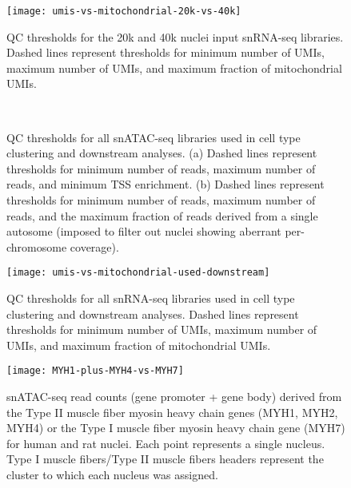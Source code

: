 \documentclass{article}
\begin{document}
\begin{figure}
\texttt{[image: umis-vs-mitochondrial-20k-vs-40k]}
\caption{QC thresholds for the 20k and 40k nuclei input snRNA-seq libraries. Dashed lines represent thresholds for minimum number of UMIs, maximum number of UMIs, and maximum fraction of mitochondrial UMIs.}
\end{figure} 

\begin{figure}
	\\
	\caption{QC thresholds for all snATAC-seq libraries used in cell type clustering and downstream analyses. (a) Dashed lines represent thresholds for minimum number of reads, maximum number of reads, and minimum TSS enrichment. (b) Dashed lines represent thresholds for minimum number of reads, maximum number of reads, and the maximum fraction of reads derived from a single autosome (imposed to filter out nuclei showing aberrant per-chromosome coverage).}
\end{figure} 

\begin{figure}
\texttt{[image: umis-vs-mitochondrial-used-downstream]}
\caption{QC thresholds for all snRNA-seq libraries used in cell type clustering and downstream analyses. Dashed lines represent thresholds for minimum number of UMIs, maximum number of UMIs, and maximum fraction of mitochondrial UMIs.}
\end{figure} 

\begin{figure}
\texttt{[image: MYH1-plus-MYH4-vs-MYH7]}
	\caption{snATAC-seq read counts (gene promoter + gene body) derived from the Type II muscle fiber myosin heavy chain genes (MYH1, MYH2, MYH4) or the Type I muscle fiber myosin heavy chain gene (MYH7) for human and rat nuclei. Each point represents a single nucleus. Type I muscle fibers/Type II muscle fibers headers represent the cluster to which each nucleus was assigned. }
\end{figure}
\end{document}
